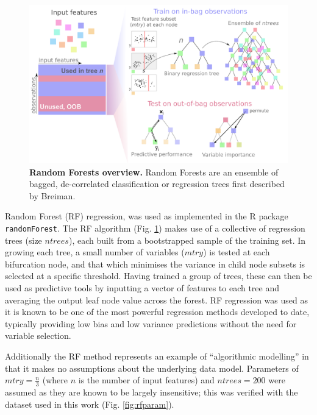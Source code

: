 \documentclass[a4paper,10pt,oneside]{book}
\begin{document}
\begin{figure}
\begin{center}
\includegraphics[width=\textwidth]{figs/randforests.pdf}
\captionsetup{width=\textwidth}
\caption{ {\bf Random Forests overview. } 
 Random Forests are an ensemble of bagged, de-correlated classification or regression trees first described by Breiman.\cite{Breiman2001a}
}\label{fig:randforests}
\end{center}
\end{figure} 

Random Forest (RF) regression,\cite{Breiman2001a}  was used
as implemented in the R package \texttt{randomForest}.\cite{Liaw2002}
The RF algorithm (Fig. \ref{fig:randforests}) makes use of a collective of regression trees (size $ntrees$), each built from a
bootstrapped sample of the training set. In growing each tree, a small
number of variables ($mtry$) is tested at each bifurcation node, and that which minimises the
variance in child node subsets is selected at a specific
threshold. Having trained a group of trees, these can then be used as
predictive tools by inputting a vector of features to each tree and
averaging the output leaf node value across the forest. RF regression
was used as it is known to be one of the most powerful regression
methods developed to date,\cite{Svetnik2003, Cutler2007} typically
providing low bias and low variance predictions without the need for
variable selection.\cite{Diaz2006, Dasgupta2012}

Additionally the RF method represents an example of ``algorithmic
modelling''\cite{Breiman2001b} in that it makes no assumptions about the
underlying data model.
Parameters of $mtry = \frac{n}{3}$ (where $n$ is the number of input features) and $ntrees =
200$ were assumed as they are known to be
largely insensitive;\cite{Dasgupta2012, Hastie2001} this was verified
with the dataset used in this work (Fig. \ref{fig:rfparam}). 
\end{document}
